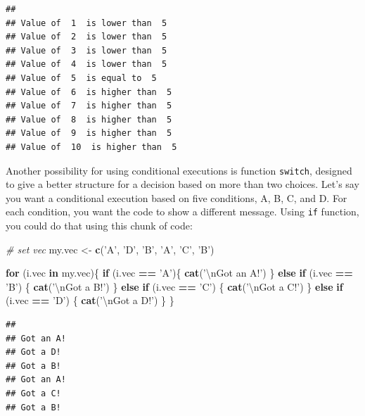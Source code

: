 \documentclass[11pt,]{book}
\newenvironment{Shaded}{\begin{snugshade}}{\end{snugshade}}
\newcommand{\KeywordTok}[1]{\textcolor[rgb]{0.27,0.27,0.27}{\textbf{#1}}}
\newcommand{\CharTok}[1]{\textcolor[rgb]{0.5,0.5,0.5}{#1}}
\newcommand{\StringTok}[1]{\textcolor[rgb]{0.5,0.5,0.5}{#1}}
\newcommand{\CommentTok}[1]{\textcolor[rgb]{0.56,0.35,0.01}{\textit{#1}}}
\newcommand{\ControlFlowTok}[1]{\textcolor[rgb]{0.13,0.29,0.53}{\textbf{#1}}}
\newcommand{\OperatorTok}[1]{\textcolor[rgb]{0.81,0.36,0.00}{\textbf{#1}}}
\newcommand{\NormalTok}[1]{#1}
\begin{document}
\begin{verbatim}
## 
## Value of  1  is lower than  5
## Value of  2  is lower than  5
## Value of  3  is lower than  5
## Value of  4  is lower than  5
## Value of  5  is equal to  5
## Value of  6  is higher than  5
## Value of  7  is higher than  5
## Value of  8  is higher than  5
## Value of  9  is higher than  5
## Value of  10  is higher than  5
\end{verbatim}

Another possibility for using conditional executions is function
\texttt{switch}, designed to give a better structure for a decision
based on more than two choices. Let's say you want a conditional
execution based on five conditions, A, B, C, and D. For each condition,
you want the code to show a different message. Using \texttt{if}
function, you could do that using this chunk of code:

\begin{Shaded}
\begin{Highlighting}[]
\CommentTok{# set vec}
\NormalTok{my.vec <-}\StringTok{ }\KeywordTok{c}\NormalTok{(}\StringTok{'A'}\NormalTok{, }\StringTok{'D'}\NormalTok{, }\StringTok{'B'}\NormalTok{, }\StringTok{'A'}\NormalTok{, }\StringTok{'C'}\NormalTok{, }\StringTok{'B'}\NormalTok{)}

\ControlFlowTok{for}\NormalTok{ (i.vec }\ControlFlowTok{in}\NormalTok{ my.vec)\{}
  \ControlFlowTok{if}\NormalTok{ (i.vec }\OperatorTok{==}\StringTok{ 'A'}\NormalTok{)\{}
    \KeywordTok{cat}\NormalTok{(}\StringTok{'}\CharTok{\textbackslash{}n}\StringTok{Got an A!'}\NormalTok{)}
\NormalTok{  \} }\ControlFlowTok{else} \ControlFlowTok{if}\NormalTok{ (i.vec }\OperatorTok{==}\StringTok{ 'B'}\NormalTok{) \{}
    \KeywordTok{cat}\NormalTok{(}\StringTok{'}\CharTok{\textbackslash{}n}\StringTok{Got a B!'}\NormalTok{)}
\NormalTok{  \} }\ControlFlowTok{else} \ControlFlowTok{if}\NormalTok{ (i.vec }\OperatorTok{==}\StringTok{ 'C'}\NormalTok{) \{}
    \KeywordTok{cat}\NormalTok{(}\StringTok{'}\CharTok{\textbackslash{}n}\StringTok{Got a C!'}\NormalTok{)}
\NormalTok{  \} }\ControlFlowTok{else} \ControlFlowTok{if}\NormalTok{ (i.vec }\OperatorTok{==}\StringTok{ 'D'}\NormalTok{) \{}
    \KeywordTok{cat}\NormalTok{(}\StringTok{'}\CharTok{\textbackslash{}n}\StringTok{Got a D!'}\NormalTok{)   }
\NormalTok{  \}}
\NormalTok{\}}
\end{Highlighting}
\end{Shaded}

\begin{verbatim}
## 
## Got an A!
## Got a D!
## Got a B!
## Got an A!
## Got a C!
## Got a B!
\end{verbatim}
\end{document}

